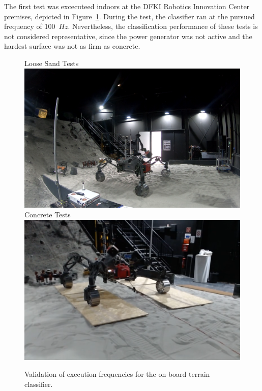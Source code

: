 The first test was excecuteed indoors at the DFKI Robotics Innovation Center premises, depicted in Figure~\ref{fig:sh-tests}.
During the test, the classifier ran at the pursued frequency of 100~$\mathit{Hz}$.
Nevertheless, the classification performance of these tests is not considered representative, since the power generator was not active and the hardest surface was not as firm as concrete. 

\begin{figure}[!htbp]
    \begin{center}
    \subcaptionbox
        {Loose Sand Tests}
        {
            \includegraphics[width=\columnwidth]{../figures/spacehall.png}
        }
    \subcaptionbox
        {Concrete Tests}
        {
            \includegraphics[width=\columnwidth]{../figures/spacehallconcrete.png}
        }
    \end{center}
    \caption{Validation of execution frequencies for the on-board terrain classifier.}
    \label{fig:sh-tests}
\end{figure}

